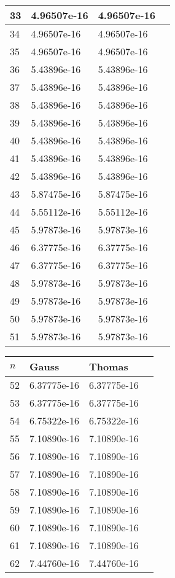 \documentclass{article}
\begin{document}
\begin{table}[H]
{\begin{tabular}{|l|l|l|l|}
33 & 4.96507e-16 & 4.96507e-16 \\ \hline
34 & 4.96507e-16 & 4.96507e-16 \\ \hline
35 & 4.96507e-16 & 4.96507e-16 \\ \hline
36 & 5.43896e-16 & 5.43896e-16 \\ \hline
37 & 5.43896e-16 & 5.43896e-16 \\ \hline
38 & 5.43896e-16 & 5.43896e-16 \\ \hline
39 & 5.43896e-16 & 5.43896e-16 \\ \hline
40 & 5.43896e-16 & 5.43896e-16 \\ \hline
41 & 5.43896e-16 & 5.43896e-16 \\ \hline
42 & 5.43896e-16 & 5.43896e-16 \\ \hline
43 & 5.87475e-16 & 5.87475e-16 \\ \hline
44 & 5.55112e-16 & 5.55112e-16 \\ \hline
45 & 5.97873e-16 & 5.97873e-16 \\ \hline
46 & 6.37775e-16 & 6.37775e-16 \\ \hline
47 & 6.37775e-16 & 6.37775e-16 \\ \hline
48 & 5.97873e-16 & 5.97873e-16 \\ \hline
49 & 5.97873e-16 & 5.97873e-16 \\ \hline
50 & 5.97873e-16 & 5.97873e-16 \\ \hline
51 & 5.97873e-16 & 5.97873e-16 \\ \hline
\end{tabular}
}
\parbox{.45\linewidth}{
\begin{tabular}{|l|l|l|l|}
\hline
$n$ & Gauss & Thomas \\ \hline
52 & 6.37775e-16 & 6.37775e-16 \\ \hline
53 & 6.37775e-16 & 6.37775e-16 \\ \hline
54 & 6.75322e-16 & 6.75322e-16 \\ \hline
55 & 7.10890e-16 & 7.10890e-16 \\ \hline
56 & 7.10890e-16 & 7.10890e-16 \\ \hline
57 & 7.10890e-16 & 7.10890e-16 \\ \hline
58 & 7.10890e-16 & 7.10890e-16 \\ \hline
59 & 7.10890e-16 & 7.10890e-16 \\ \hline
60 & 7.10890e-16 & 7.10890e-16 \\ \hline
61 & 7.10890e-16 & 7.10890e-16 \\ \hline
62 & 7.44760e-16 & 7.44760e-16 \\ \hline

\end{tabular}}
\end{table}
\end{document}
